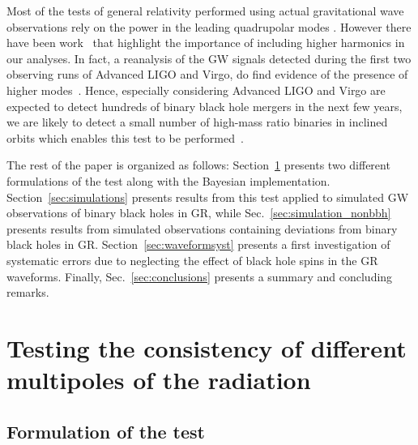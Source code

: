 \documentclass[prd,preprintnumbers,twocolumn,eqsecnum,floatfix,a4paper,nofootinbib,superscriptaddress]{revtex4}
\begin{document}
Most of the tests of general relativity performed using actual gravitational wave observations rely on the power in the leading quadrupolar modes \cite{LSC_2016grtests,gw170104,ligo2019tests,abbott2019tests,abbott2017gravitational}. However there have been work~\cite{Bustillo:2015ova,2015arXiv150100918C,Varma:2014hm,CalderonBustillo:2016hm,Bustillo2016_hm} that highlight the importance of including higher harmonics in our analyses. In fact, a reanalysis of the GW signals detected during the first two observing runs of Advanced LIGO and Virgo, do find evidence of the presence of higher modes~\cite{Chatziioannou:2019dsz}. Hence, especially considering Advanced LIGO and Virgo are expected to detect hundreds of binary black hole mergers in the next few years, we are likely to detect a small number of high-mass ratio binaries in inclined orbits which enables this test to be performed~\cite{Dhanpal:2018ufk}. 

The rest of the paper is organized as follows: Section~\ref{sec:test} presents two different formulations of the test along with the Bayesian implementation. Section~\ref{sec:simulations} presents results from this test applied to simulated GW observations of binary black holes in GR, while Sec.~\ref{sec:simulation_nonbbh} presents results from simulated observations containing deviations from binary black holes in GR. Section~\ref{sec:waveformsyst} presents a first investigation of systematic errors due to neglecting the effect of black hole spins in the GR waveforms. Finally, Sec.~\ref{sec:conclusions} presents a summary and concluding remarks. 

\section{Testing the consistency of different multipoles of the radiation}
\label{sec:test}

\subsection{Formulation of the test}
\end{document}
